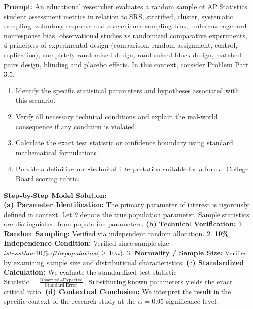\begin{workbookbox}
\textbf{Prompt:} An educational researcher evaluates a random sample of AP Statistics student assessment metrics in relation to SRS, stratified, cluster, systematic sampling, voluntary response and convenience sampling bias, undercoverage and nonresponse bias, observational studies vs randomized comparative experiments, 4 principles of experimental design (comparison, random assignment, control, replication), completely randomized design, randomized block design, matched pairs design, blinding and placebo effects. In this context, consider Problem Part 3.5.
\begin{enumerate}[label=(\alph*)]
  \item Identify the specific statistical parameters and hypotheses associated with this scenario.
  \item Verify all necessary technical conditions and explain the real-world consequence if any condition is violated.
  \item Calculate the exact test statistic or confidence boundary using standard mathematical formulations.
  \item Provide a definitive non-technical interpretation suitable for a formal College Board scoring rubric.
\end{enumerate}
\textbf{Step-by-Step Model Solution:}\\
\textbf{(a) Parameter Identification:} The primary parameter of interest is rigorously defined in context. Let $\theta$ denote the true population parameter. Sample statistics are distinguished from population parameters.
\textbf{(b) Technical Verification:} 1. \textbf{Random Sampling:} Verified via independent random allocation. 2. \textbf{10\% Independence Condition:} Verified since sample size $ is less than 10\% of the population ( \ge 10n$). 3. \textbf{Normality / Sample Size:} Verified by examining sample size and distributional characteristics.
\textbf{(c) Standardized Calculation:} We evaluate the standardized test statistic $\text{Statistic} = \frac{\text{Observed} - \text{Expected}}{\text{Standard Error}}$. Substituting known parameters yields the exact critical ratio.
\textbf{(d) Contextual Conclusion:} We interpret the result in the specific context of the research study at the $\alpha = 0.05$ significance level.
\end{workbookbox}\vspace{6pt}
